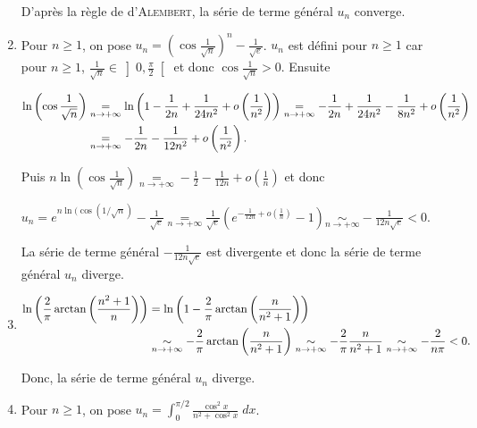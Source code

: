 \documentclass[11pt,a4paper]{article}
\newcommand{\Arctan}{\mathop{\mathrm{arctan}}\nolimits}
\begin{document}
\begin{enumerate}
D'après la règle de d'\textsc{Alembert}, la série de terme général $u_n$ converge.

\item  Pour $n\geqslant1$, on pose $u_n=\left(\cos\frac{1}{\sqrt{n}}\right)^n-\frac{1}{\sqrt{e}}$. $u_n$ est défini pour $n\geqslant1$ car pour $n\geqslant1$, $\frac{1}{\sqrt{n}}\in\left]0,\frac{\pi}{2}\right[$ et donc $\cos\frac{1}{\sqrt{n}}>0$. Ensuite

\begin{align*}\ensuremath
\ln\left(\cos\frac{1}{\sqrt{n}}\right)&\underset{n\rightarrow+\infty}{=}\ln\left(1-\frac{1}{2n}+\frac{1}{24n^2}+o\left(\frac{1}{n^2}\right)\right)\underset{n\rightarrow+\infty}{=}-\frac{1}{2n}+\frac{1}{24n^2}-\frac{1}{8n^2}+o\left(\frac{1}{n^2}\right)\\
 &\underset{n\rightarrow+\infty}{=}-\frac{1}{2n}-\frac{1}{12n^2}+o\left(\frac{1}{n^2}\right).
\end{align*}

Puis $n\ln\left(\cos\frac{1}{\sqrt{n}}\right)\underset{n\rightarrow+\infty}{=}-\frac{1}{2}-\frac{1}{12n}+o\left(\frac{1}{n}\right)$ et donc

\begin{center}
$u_n=e^{n\ln(\cos(1/\sqrt{n})}-\frac{1}{\sqrt{e}}\underset{n\rightarrow+\infty}{=}\frac{1}{\sqrt{e}}\left(e^{-\frac{1}{12n}+o\left(\frac{1}{n}\right)}-1\right)\underset{n\rightarrow+\infty}{\sim}-\frac{1}{12n\sqrt{e}}<0$.
\end{center}

La série de terme général $-\frac{1}{12n\sqrt{e}}$ est  divergente et donc la série de terme général $u_n$ diverge.

\item 

\begin{align*}\ensuremath
\ln\left(\frac{2}{\pi}\Arctan\left(\frac{n^2+1}{n}\right)\right)&=\ln\left(1-\frac{2}{\pi}\Arctan\left(\frac{n}{n^2+1}\right)\right)\\
 &\underset{n\rightarrow+\infty}{\sim}-\frac{2}{\pi}\Arctan\left(\frac{n}{n^2+1}\right)\underset{n\rightarrow+\infty}{\sim}-\frac{2}{\pi}\frac{n}{n^2+1}\underset{n\rightarrow+\infty}{\sim}-\frac{2}{n\pi}<0.
\end{align*}

Donc, la série de terme général $u_n$ diverge.

\item  Pour $n\geqslant1$, on pose $u_n=\int_{0}^{\pi/2}\frac{\cos^2x}{n^2+\cos^2x}\;dx$.


\end{enumerate}
\end{document}
